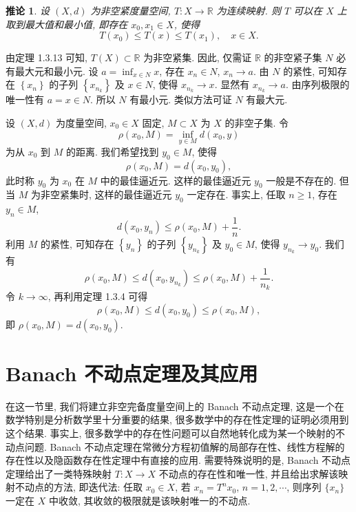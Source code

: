 \documentclass[openany]{ctexbook}
\makeatletter
\theoremstyle{kaiti}
\newtheorem{corollary}{推论}[section]
\theoremstyle{normal}
\renewenvironment{proof}[1][\proofname]{\par
    \pushQED{\qed}%
    \normalfont \topsep6\p@\@plus6\p@\relax
    \trivlist
    \item\relax
    {\heiti #1}\hspace{2\labelsep}\ignorespaces
  }{%
    \popQED\endtrivlist\@endpefalse
  }
\makeatother
\begin{document}
\begin{corollary}
  设 $(X, d)$ 为非空紧度量空间, $T: X \rightarrow \mathbb{R}$ 为连续映射. 则 $T$ 可以在 $X$ 上取到最大值和最小值, 即存在 $x_0, x_1 \in X$, 使得
  $$
  T\left(x_0\right) \leqslant T(x) \leqslant T\left(x_1\right), \quad x \in X.
  $$
\end{corollary}

\begin{proof}
由定理 1.3.13 可知, $T(X) \subset \mathbb{R}$ 为非空紧集. 因此, 仅需证 $\mathbb{R}$ 的非空紧子集 $N$ 必有最大元和最小元. 设 $a=\inf_{x \in N} x$, 存在 $x_n \in N$, $x_n \rightarrow a$. 由 $N$ 的紧性, 可知存在 $\left\{x_n\right\}$ 的子列 $\left\{x_{n_{k}}\right\}$ 及 $x \in N$, 使得 $x_{n_{k}} \rightarrow x$. 显然有 $x_{n_{k}} \rightarrow a$. 由序列极限的唯一性有 $a=x \in N$. 所以 $N$ 有最小元. 类似方法可证 $N$ 有最大元.
\end{proof}

设 $(X, d)$ 为度量空间, $x_0 \in X$ 固定, $M \subset X$ 为 $X$ 的非空子集. 令
$$
\rho\left(x_0, M\right)=\inf_{y \in M} d\left(x_0, y\right)
$$
为从 $x_0$ 到 $M$ 的距离. 我们希望找到 $y_0 \in M$, 使得
$$
\rho\left(x_0, M\right)=d\left(x_0, y_0\right),
$$
此时称 $y_0$ 为 $x_0$ 在 $M$ 中的最佳逼近元. 这样的最佳逼近元 $y_0$ 一般是不存在的. 但当 $M$ 为非空紧集时, 这样的最佳逼近元 $y_0$ 一定存在. 事实上, 任取 $n \geqslant 1$, 存在 $y_n \in M$,
$$
d\left(x_0, y_n\right) \leqslant \rho\left(x_0, M\right)+\frac{1}{n}.
$$
利用 $M$ 的紧性, 可知存在 $\left\{y_n\right\}$ 的子列 $\left\{y_{n_{k}}\right\}$ 及 $y_0 \in M$, 使得 $y_{n_{k}} \rightarrow y_0$. 我们有
$$
\rho\left(x_0, M\right) \leqslant d\left(x_0, y_{n_{k}}\right) \leqslant \rho\left(x_0, M\right)+\frac{1}{n_{k}}.
$$
令 $k \rightarrow \infty$, 再利用定理 1.3.4 可得
$$
\rho\left(x_0, M\right) \leqslant d\left(x_0, y_0\right) \leqslant \rho\left(x_0, M\right),
$$
即 $\rho\left(x_0, M\right)=d\left(x_0, y_0\right)$.

\section{Banach 不动点定理及其应用}

在这一节里, 我们将建立非空完备度量空间上的 Banach 不动点定理, 这是一个在数学特别是分析数学里十分重要的结果, 很多数学中的存在性定理的证明必须用到这个结果. 事实上, 很多数学中的存在性问题可以自然地转化成为某一个映射的不动点问题. Banach 不动点定理在常微分方程初值解的局部存在性、线性方程解的存在性以及隐函数存在性定理中有直接的应用. 需要特殊说明的是, Banach 不动点定理给出了一类特殊映射 $T: X \rightarrow X$ 不动点的存在性和唯一性, 并且给出求解该映射不动点的方法, 即迭代法: 任取 $x_0 \in X$, 若 $x_n=T^n x_0$, $n=1,2, \cdots$, 则序列 $\{x_n\}$ 一定在 $X$ 中收敛, 其收敛的极限就是该映射唯一的不动点.
\end{document}
